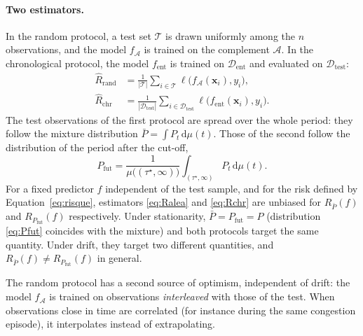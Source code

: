 \documentclass[11pt,a4paper]{article}
\theoremstyle{definition}
\begin{document}
\paragraph{Two estimators.} In the random protocol, a test set $\mathcal{T}$ is drawn uniformly among the $n$ observations, and the model $f_{\mathcal{A}}$ is trained on the complement $\mathcal{A}$. In the chronological protocol, the model $f_{\mathrm{ent}}$ is trained on $\mathcal{D}_{\mathrm{ent}}$ and evaluated on $\mathcal{D}_{\mathrm{test}}$:
\begin{align}
  \widehat{R}_{\mathrm{rand}} &= \frac{1}{|\mathcal{T}|} \sum_{i\in\mathcal{T}} \ell\bigl(f_{\mathcal{A}}(\mathbf{x}_i), y_i\bigr), \label{eq:Ralea}\\
  \widehat{R}_{\mathrm{chr}} &= \frac{1}{|\mathcal{D}_{\mathrm{test}}|} \sum_{i\in\mathcal{D}_{\mathrm{test}}} \ell\bigl(f_{\mathrm{ent}}(\mathbf{x}_i), y_i\bigr). \label{eq:Rchr}
\end{align}
The test observations of the first protocol are spread over the whole period: they follow the mixture distribution $\bar{P} = \int P_t \,\mathrm{d}\mu(t)$. Those of the second follow the distribution of the period after the cut-off,
\begin{equation}
  P_{\mathrm{fut}} = \frac{1}{\mu\bigl((\tau^\star,\infty)\bigr)} \int_{(\tau^\star,\infty)} P_t \,\mathrm{d}\mu(t).
  \label{eq:Pfut}
\end{equation}
For a fixed predictor $f$ independent of the test sample, and for the risk defined by Equation~\eqref{eq:risque}, estimators \eqref{eq:Ralea} and \eqref{eq:Rchr} are unbiased for $R_{\bar{P}}(f)$ and $R_{P_{\mathrm{fut}}}(f)$ respectively. Under stationarity, $\bar{P} = P_{\mathrm{fut}} = P$ (distribution \eqref{eq:Pfut} coincides with the mixture) and both protocols target the same quantity. Under drift, they target two different quantities, and $R_{\bar{P}}(f) \neq R_{P_{\mathrm{fut}}}(f)$ in general.

The random protocol has a second source of optimism, independent of drift: the model $f_{\mathcal{A}}$ is trained on observations \emph{interleaved} with those of the test. When observations close in time are correlated (for instance during the same congestion episode), it interpolates instead of extrapolating.
\end{document}
